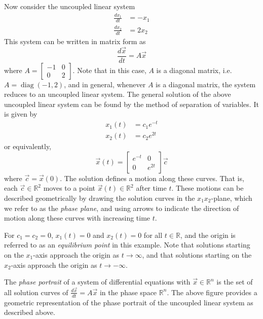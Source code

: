 \documentclass[11pt]{book}
\theoremstyle{definition}\newtheorem{definition}[subsection]{Definition}
\theoremstyle{definition}\newtheorem{example}[subsection]{Example}
\theoremstyle{definition}\newtheorem{notation}[subsection]{Notation}
\theoremstyle{definition}\newtheorem{remark}[subsection]{Remark}
\theoremstyle{theorem}\newtheorem{theorem}[subsection]{Theorem}
\theoremstyle{theorem}\newtheorem{lemma}[subsection]{Lemma}
\theoremstyle{theorem}\newtheorem{proposition}[subsection]{Proposition}
\theoremstyle{theorem}\newtheorem{corollary}[subsection]{Corollary}
\theoremstyle{theorem}\newtheorem{case}{Case}
\theoremstyle{remark}\newtheorem{subcase}{Subcase}[case]
\newcommand{\R}{\mathbb{R}}
\DeclareMathOperator{\diag}{diag}
\begin{document}
Now consider the uncoupled linear system
\begin{align*}
    \frac{dx_1}{dt} &= -x_1 \\
    \frac{dx_2}{dt} &= 2x_2
\end{align*}
This system can be written in matrix form as
\begin{equation*}
    \frac{d\vec{x}}{dt} = A\vec{x}
\end{equation*}
where $A = \begin{bmatrix} -1 & 0 \\ 0 & 2 \end{bmatrix}$. Note that in this case, $A$ is a diagonal matrix, i.e. $A = \diag(-1, 2)$, and in general, whenever $A$ is a diagonal matrix, the system reduces to an uncoupled linear system. The general solution of the above uncoupled linear system can be found by the method of separation of variables. It is given by
\begin{align*}
    x_1(t) &= c_1e^{-t} \\
    x_2(t) &= c_2e^{2t}
\end{align*}
or equivalently,
\begin{equation*}
    \vec{x}(t) = \begin{bmatrix} e^{-t} & 0 \\ 0 & e^{2t} \end{bmatrix} \vec{c}
\end{equation*}
where $\vec{c} = \vec{x}(0)$. The solution defines a motion along these curves. That is, each $\vec{c} \in \R^2$ moves to a point $\vec{x}(t) \in \R^2$ after time $t$. These motions can be described geometrically by drawing the solution curves in the $x_1x_2$-plane, which we refer to as the \emph{phase plane}, and using arrows to indicate the direction of motion along these curves with increasing time $t$.

For $c_1 = c_2 = 0$, $x_1(t) = 0$ and $x_2(t) = 0$ for all $t \in \R$, and the origin is referred to as an \emph{equilibrium point} in this example. Note that solutions starting on the $x_1$-axis approach the origin as $t \to \infty$, and that solutions starting on the $x_2$-axis approach the origin as $t \to -\infty$.

The \emph{phase portrait} of a system of differential equations with $\vec{x} \in \R^n$ is the set of all solution curves of $\frac{d\vec{x}}{dt} = A\vec{x}$ in the phase space $\R^n$. The above figure provides a geometric representation of the phase portrait of the uncoupled linear system as described above.
\end{document}
